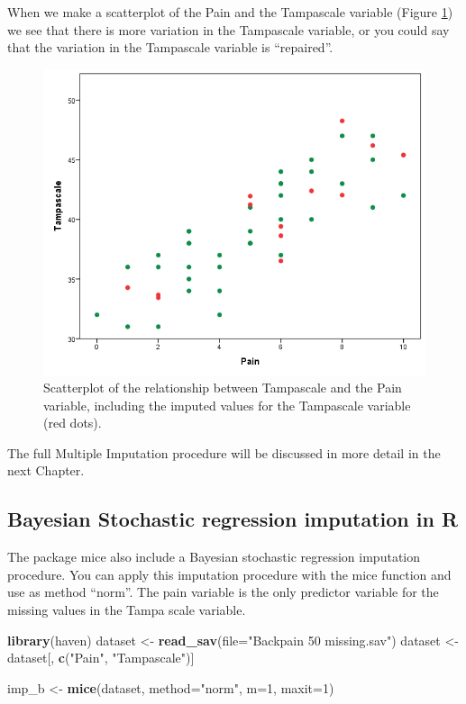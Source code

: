\documentclass[]{book}
\newenvironment{Shaded}{\begin{snugshade}}{\end{snugshade}}
\newcommand{\KeywordTok}[1]{\textcolor[rgb]{0.13,0.29,0.53}{\textbf{#1}}}
\newcommand{\DataTypeTok}[1]{\textcolor[rgb]{0.13,0.29,0.53}{#1}}
\newcommand{\DecValTok}[1]{\textcolor[rgb]{0.00,0.00,0.81}{#1}}
\newcommand{\StringTok}[1]{\textcolor[rgb]{0.31,0.60,0.02}{#1}}
\newcommand{\NormalTok}[1]{#1}
\begin{document}
When we make a scatterplot of the Pain and the Tampascale variable
(Figure \ref{fig:fig3-24}) we see that there is more variation in the
Tampascale variable, or you could say that the variation in the
Tampascale variable is ``repaired''.

\begin{figure}

{\centering \includegraphics[width=0.7\linewidth]{images/Fig3.24} 

}

\caption{Scatterplot of the relationship between Tampascale and the Pain variable, including the imputed values for the Tampascale variable (red dots).}\label{fig:fig3-24}
\end{figure}

The full Multiple Imputation procedure will be discussed in more detail
in the next Chapter.

\subsection{Bayesian Stochastic regression imputation in
R}\label{bayesian-stochastic-regression-imputation-in-r}

The package mice also include a Bayesian stochastic regression
imputation procedure. You can apply this imputation procedure with the
mice function and use as method ``norm''. The pain variable is the only
predictor variable for the missing values in the Tampa scale variable.

\begin{Shaded}
\begin{Highlighting}[]
\KeywordTok{library}\NormalTok{(haven)}
\NormalTok{dataset <-}\StringTok{ }\KeywordTok{read_sav}\NormalTok{(}\DataTypeTok{file=}\StringTok{"Backpain 50 missing.sav"}\NormalTok{)}
\NormalTok{dataset <-}\StringTok{ }\NormalTok{dataset[, }\KeywordTok{c}\NormalTok{(}\StringTok{"Pain"}\NormalTok{, }\StringTok{"Tampascale"}\NormalTok{)]}

\NormalTok{imp_b <-}\StringTok{ }\KeywordTok{mice}\NormalTok{(dataset, }\DataTypeTok{method=}\StringTok{"norm"}\NormalTok{, }\DataTypeTok{m=}\DecValTok{1}\NormalTok{, }\DataTypeTok{maxit=}\DecValTok{1}\NormalTok{)}
\end{Highlighting}
\end{Shaded}
\end{document}
